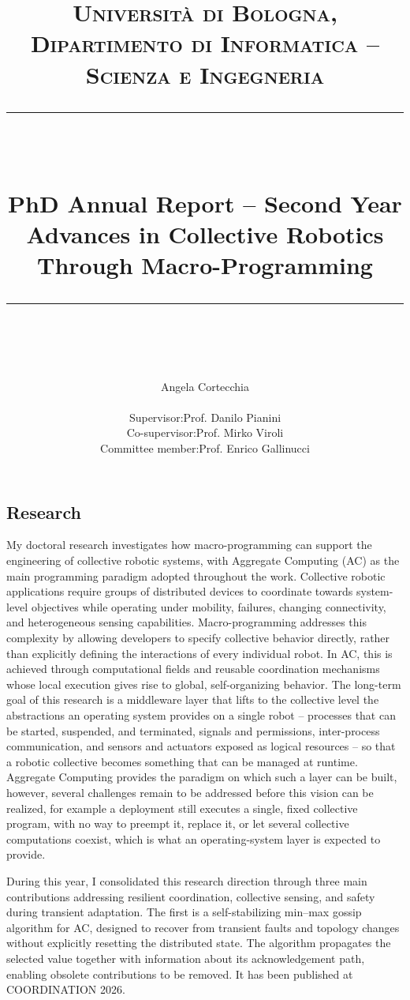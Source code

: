 \documentclass[11pt]{scrartcl}
\title{%
  \normalfont\normalsize

  \textsc{%
    Università di Bologna,
    Dipartimento di Informatica -- Scienza e Ingegneria
  }\\

  \vspace{25pt}
  \rule{\linewidth}{0.5pt}\\
  \vspace{20pt}

  {\huge PhD Annual Report -- Second Year\\
  \vspace{15pt}
  \LARGE Advances in Collective Robotics Through Macro-Programming\\[14pt]
  }

  \vspace{12pt}
  \rule{\linewidth}{2pt}\\
  \vspace{12pt}
}
\author{%
  \LARGE Angela Cortecchia\\[14pt]
  \normalsize
  \begin{tabular}{@{}ll@{}}
    Supervisor: & Prof. Danilo Pianini \\
    Co-supervisor: & Prof. Mirko Viroli \\
    Committee member: & Prof. Enrico Gallinucci
  \end{tabular}%
}
\date{}
\begin{document}
\maketitle


\subsection*{Research}

My doctoral research investigates how macro-programming can support the engineering of collective robotic systems,
with Aggregate Computing (AC) as the main programming paradigm adopted throughout the work.
%
Collective robotic applications require groups of distributed devices to coordinate towards system-level objectives while operating under mobility,
failures, changing connectivity, and heterogeneous sensing capabilities.
%
Macro-programming addresses this complexity by allowing developers to specify collective behavior directly,
rather than explicitly defining the interactions of every individual robot.
%
In AC, this is achieved through computational fields and reusable coordination mechanisms whose local execution gives rise to global,
self-organizing behavior.
%
The long-term goal of this research is
a middleware layer that lifts to the collective level the abstractions an operating system provides on a single robot
-- processes that can be started, suspended, and terminated, signals and permissions,
inter-process communication, and sensors and actuators exposed as logical resources --
so that a robotic collective becomes something that can be managed at runtime.
%
Aggregate Computing provides the paradigm on which such a layer can be built,
however, several challenges remain to be addressed before this vision can be realized,
for example a deployment still executes a single, fixed collective program, with no way to preempt it, replace it, or let several collective computations coexist,
which is what an operating-system layer is expected to provide.

During this year, I consolidated this research direction through three main contributions addressing resilient coordination, collective sensing, and safety during transient adaptation.
%
The first is a self-stabilizing min--max gossip algorithm for AC, designed to recover from transient faults and topology changes without explicitly resetting the distributed state.
%
The algorithm propagates the selected value together with information about its acknowledgement path, enabling obsolete contributions to be removed.
%
It has been published at COORDINATION 2026.
\end{document}
